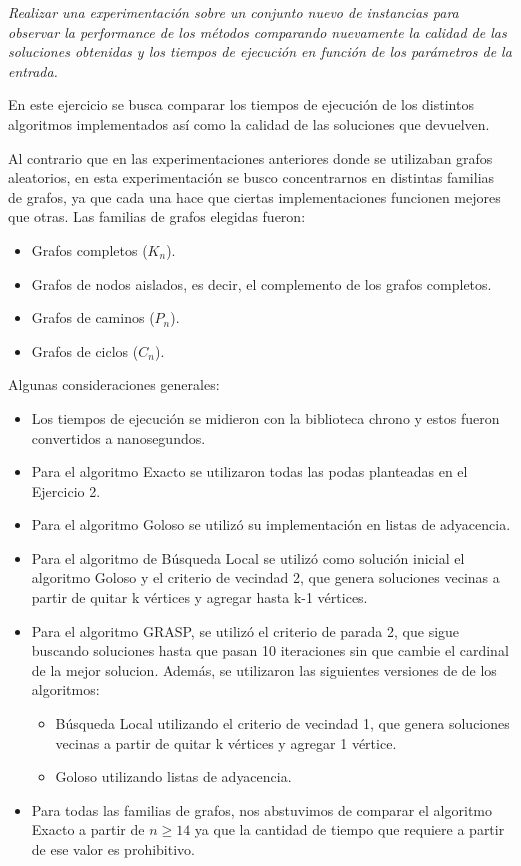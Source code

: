\textit{Realizar una experimentación sobre un conjunto nuevo de instancias para observar la performance de los métodos comparando nuevamente la calidad de las soluciones obtenidas y los tiempos de ejecución en función de los parámetros de la entrada.}
\medskip

En este ejercicio se busca comparar los tiempos de ejecución de los distintos algoritmos implementados así como la calidad de las soluciones que devuelven.

Al contrario que en las experimentaciones anteriores donde se utilizaban grafos aleatorios, en esta experimentación se busco concentrarnos en distintas familias de grafos, ya que cada una hace que ciertas implementaciones funcionen mejores que otras. Las familias de grafos elegidas fueron:
\begin{itemize}
    \item Grafos completos ($K_n$).
    \item Grafos de nodos aislados, es decir, el complemento de los grafos completos.
    \item Grafos de caminos ($P_n$).
    \item Grafos de ciclos ($C_n$).
\end{itemize}

Algunas consideraciones generales:
\begin{itemize}
    \item Los tiempos de ejecución se midieron con la biblioteca chrono y estos fueron convertidos a nanosegundos.
    \item Para el algoritmo Exacto se utilizaron todas las podas planteadas en el Ejercicio 2.
    \item Para el algoritmo Goloso se utilizó su implementación en listas de adyacencia.
    \item Para el algoritmo de Búsqueda Local se utilizó como solución inicial el algoritmo Goloso y el criterio de vecindad 2, que genera soluciones vecinas a partir de quitar k vértices y agregar hasta k-1 vértices.
    \item Para el algoritmo GRASP, se utilizó el criterio de parada 2, que sigue buscando soluciones hasta que pasan 10 iteraciones sin que cambie el cardinal de la mejor solucion. Además, se utilizaron las siguientes versiones de de los algoritmos:
        \begin{itemize}
            \item Búsqueda Local utilizando el criterio de vecindad 1, que genera soluciones vecinas a partir de quitar k vértices y agregar 1 vértice.
            \item Goloso utilizando listas de adyacencia.
        \end{itemize}
    \item Para todas las familias de grafos, nos abstuvimos de comparar el algoritmo Exacto a partir de $n \geq 14$ ya que la cantidad de tiempo que requiere a partir de ese valor es prohibitivo.
\end{itemize}

